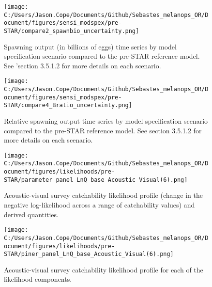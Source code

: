 \documentclass[11pt,
  letterpaper,
]{article}
\begin{document}
\newpage

\begin{figure}
{\centering
\texttt{[image: C:/Users/Jason.Cope/Documents/Github/Sebastes\_melanops\_OR/Document/figures/sensi\_modspex/pre-STAR/compare2\_spawnbio\_uncertainty.png]}
}
\caption{Spawning output (in billions of eggs) time series by model specification scenario compared to the pre-STAR reference model. See 'section 3.5.1.2 for more details on each scenario.\label{fig:sensi-modspec-ssb_preSTAR}}
\end{figure}

\newpage

\begin{figure}
{\centering
\texttt{[image: C:/Users/Jason.Cope/Documents/Github/Sebastes\_melanops\_OR/Document/figures/sensi\_modspex/pre-STAR/compare4\_Bratio\_uncertainty.png]}
}
\caption{Relative spawning output time series by model specification scenario compared to the pre-STAR reference model. See section 3.5.1.2 for more details on each scenario.\label{fig:sensi-modspec-depl_preSTAR}}
\end{figure}

\newpage

\begin{figure}
{\centering
\texttt{[image: C:/Users/Jason.Cope/Documents/Github/Sebastes\_melanops\_OR/Document/figures/likelihoods/pre-STAR/parameter\_panel\_LnQ\_base\_Acoustic\_Visual(6).png]}
}
\caption{Acoustic-visual survey catchability likelihood profile (change in the negative log-likelihood across a range of catchability values) and derived quantities.\label{fig:AVq-profile}}
\end{figure}

\newpage

\begin{figure}
{\centering
\texttt{[image: C:/Users/Jason.Cope/Documents/Github/Sebastes\_melanops\_OR/Document/figures/likelihoods/pre-STAR/piner\_panel\_LnQ\_base\_Acoustic\_Visual(6).png]}
}
\caption{Acoustic-visual survey catchability likelihood profile for each of the likelihood components.\label{fig:AVq-profile-components}}
\end{figure}
\end{document}
